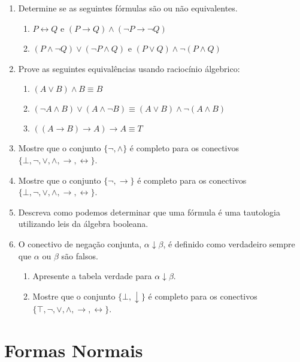 \begin{enumerate}
        \item Determine se as seguintes f\'ormulas s\~ao ou n\~ao
          equivalentes.
         \begin{enumerate}
		\item $P\leftrightarrow Q$ e $(P\rightarrow Q)\land(\neg P\rightarrow \neg Q)$
		\item $(P\land\neg Q)\lor (\neg P\land Q)$ e $(P\lor Q)\land\neg(P\land Q)$
          \end{enumerate}
	\item Prove as seguintes equival\^encias usando racioc\'inio \'algebrico:
	\begin{enumerate}
		\item $(A\lor B)\land B\equiv B$
		\item $(\neg A\land B)\lor (A\land\neg B)\equiv (A\lor B)\land \neg (A\land B)$
		\item $((A\rightarrow B)\rightarrow A)\rightarrow A\equiv T$
	\end{enumerate}
        \item Mostre que o conjunto $\{\neg,\land\}$ é completo para
          os conectivos
          $\{\bot,\neg,\lor,\land,\to,\leftrightarrow\}$.
        \item Mostre que o conjunto $\{\neg,\to\}$ é completo para os
          conectivos $\{\bot,\neg,\lor,\land,\to,\leftrightarrow\}$.
        \item Descreva como podemos determinar que uma fórmula é uma
          tautologia utilizando leis da álgebra booleana.
        \item O conectivo de negação conjunta,
          $\alpha\downarrow\beta$, é definido como verdadeiro sempre
          que $\alpha$ ou $\beta$ são falsos.
         \begin{enumerate}
              \item Apresente a tabela verdade para
                $\alpha\downarrow\beta$.
              \item Mostre que o conjunto $\{\bot,\downarrow\}$ é completo
                para os conectivos $\{\top,\neg,\lor,\land,\to,\leftrightarrow\}$.
         \end{enumerate}
\end{enumerate}


\section{Formas Normais}

